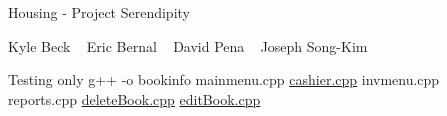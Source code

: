 Housing -\/ Project Serendipity

Kyle Beck ~\newline
 Eric Bernal ~\newline
 David Pena ~\newline
 Joseph Song-\/\+Kim ~\newline


Testing only g++ -\/o bookinfo mainmenu.\+cpp \mbox{\hyperlink{cashier_8cpp}{cashier.\+cpp}} invmenu.\+cpp reports.\+cpp \mbox{\hyperlink{deleteBook_8cpp}{delete\+Book.\+cpp}} \mbox{\hyperlink{editBook_8cpp}{edit\+Book.\+cpp}} 